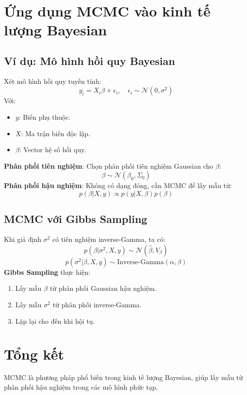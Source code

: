 \section{Ứng dụng MCMC vào kinh tế lượng Bayesian}
\subsection{Ví dụ: Mô hình hồi quy Bayesian}
Xét mô hình hồi quy tuyến tính:
\begin{equation}
    y_i = X_i \beta + \epsilon_i, \quad \epsilon_i \sim \mathcal{N}(0, \sigma^2)
\end{equation}
Với:
\begin{itemize}
    \item $y$: Biến phụ thuộc.
    \item $X$: Ma trận biến độc lập.
    \item $\beta$: Vector hệ số hồi quy.
\end{itemize}
\textbf{Phân phối tiên nghiệm}: Chọn phân phối tiên nghiệm Gaussian cho $\beta$:
\begin{equation}
    \beta \sim \mathcal{N}(\beta_0, \Sigma_0)
\end{equation}
\textbf{Phân phối hậu nghiệm}: Không có dạng đóng, cần MCMC để lấy mẫu từ:
\begin{equation}
    p(\beta | X, y) \propto p(y | X, \beta) p(\beta)
\end{equation}
\subsection{MCMC với Gibbs Sampling}
Khi giả định $\sigma^2$ có tiên nghiệm inverse-Gamma, ta có:
\begin{equation}
    p(\beta | \sigma^2, X, y) \sim \mathcal{N}(\hat{\beta}, V_{\beta})
\end{equation}
\begin{equation}
    p(\sigma^2 | \beta, X, y) \sim \text{Inverse-Gamma}(\alpha, \beta)
\end{equation}
\textbf{Gibbs Sampling} thực hiện:
\begin{enumerate}
    \item Lấy mẫu $\beta$ từ phân phối Gaussian hậu nghiệm.
    \item Lấy mẫu $\sigma^2$ từ phân phối inverse-Gamma.
    \item Lặp lại cho đến khi hội tụ.
\end{enumerate}

\section{Tổng kết}
MCMC là phương pháp phổ biến trong kinh tế lượng Bayesian, giúp lấy mẫu từ phân phối hậu nghiệm trong các mô hình phức tạp.
